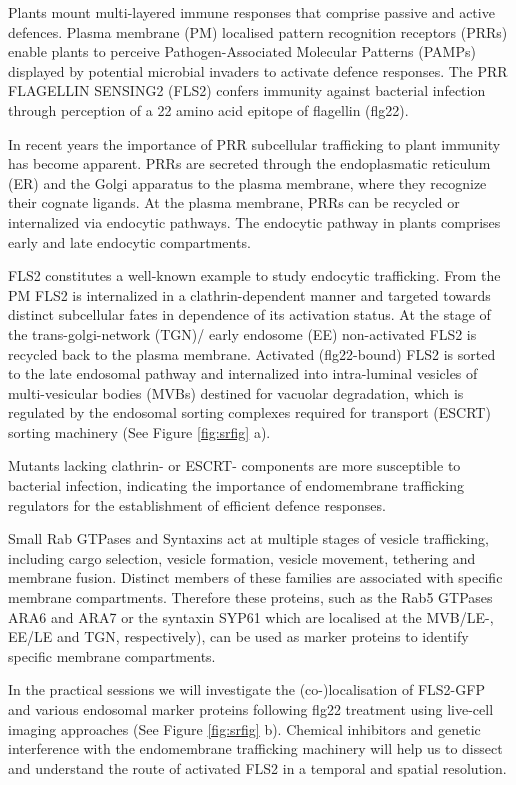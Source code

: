 \documentclass[12pt,]{book}
\begin{document}
Plants mount multi-layered immune responses that comprise passive and
active defences. Plasma membrane (PM) localised pattern recognition
receptors (PRRs) enable plants to perceive Pathogen-Associated Molecular
Patterns (PAMPs) displayed by potential microbial invaders to activate
defence responses. The PRR FLAGELLIN SENSING2 (FLS2) confers immunity
against bacterial infection through perception of a 22 amino acid
epitope of flagellin (flg22).

In recent years the importance of PRR subcellular trafficking to plant
immunity has become apparent. PRRs are secreted through the
endoplasmatic reticulum (ER) and the Golgi apparatus to the plasma
membrane, where they recognize their cognate ligands. At the plasma
membrane, PRRs can be recycled or internalized via endocytic pathways.
The endocytic pathway in plants comprises early and late endocytic
compartments.

FLS2 constitutes a well-known example to study endocytic trafficking.
From the PM FLS2 is internalized in a clathrin-dependent manner and
targeted towards distinct subcellular fates in dependence of its
activation status. At the stage of the trans-golgi-network (TGN)/ early
endosome (EE) non-activated FLS2 is recycled back to the plasma
membrane. Activated (flg22-bound) FLS2 is sorted to the late endosomal
pathway and internalized into intra-luminal vesicles of multi-vesicular
bodies (MVBs) destined for vacuolar degradation, which is regulated by
the endosomal sorting complexes required for transport (ESCRT) sorting
machinery (See Figure \ref{fig:srfig} a).

Mutants lacking clathrin- or ESCRT- components are more susceptible to
bacterial infection, indicating the importance of endomembrane
trafficking regulators for the establishment of efficient defence
responses.

Small Rab GTPases and Syntaxins act at multiple stages of vesicle
trafficking, including cargo selection, vesicle formation, vesicle
movement, tethering and membrane fusion. Distinct members of these
families are associated with specific membrane compartments. Therefore
these proteins, such as the Rab5 GTPases ARA6 and ARA7 or the syntaxin
SYP61 which are localised at the MVB/LE-, EE/LE and TGN, respectively),
can be used as marker proteins to identify specific membrane
compartments.

In the practical sessions we will investigate the (co-)localisation of
FLS2-GFP and various endosomal marker proteins following flg22 treatment
using live-cell imaging approaches (See Figure \ref{fig:srfig} b).
Chemical inhibitors and genetic interference with the endomembrane
trafficking machinery will help us to dissect and understand the route
of activated FLS2 in a temporal and spatial resolution.
\end{document}
